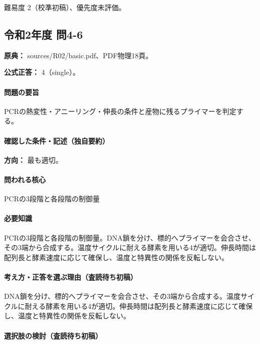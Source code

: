 \par 難易度 2（校準初稿）、優先度未評価。

\subsection{令和2年度 問4-6}
\label{q:r02-reg-basic-4-6}

\noindent\textbf{原典：} sources/R02/basic.pdf、PDF物理18頁。

\textbf{公式正答：} 4（single）。

\paragraph{問題の要旨} PCRの熱変性・アニーリング・伸長の条件と産物に残るプライマーを判定する。

\paragraph{確認した条件・記述（独自要約）}\mbox{}\par

\noindent\textbf{方向：} 最も適切。\par

\paragraph{問われる核心} PCRの3段階と各段階の制御量

\paragraph{必要知識} PCRの3段階と各段階の制御量。DNA鎖を分け、標的へプライマーを会合させ、その3端から合成する。温度サイクルに耐える酵素を用いる4が適切。伸長時間は配列長と酵素速度に応じて確保し、温度と特異性の関係を反転しない。

\paragraph{考え方・正答を選ぶ理由（査読待ち初稿）} DNA鎖を分け、標的へプライマーを会合させ、その3端から合成する。温度サイクルに耐える酵素を用いる4が適切。伸長時間は配列長と酵素速度に応じて確保し、温度と特異性の関係を反転しない。

\paragraph{選択肢の検討（査読待ち初稿）}\mbox{}\par

